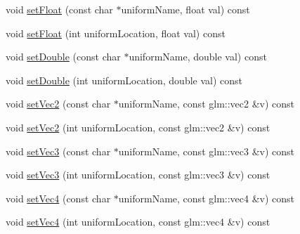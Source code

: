 \textbf{ }\par
\begin{DoxyCompactItemize}
\item 
void \mbox{\hyperlink{classec_1_1_shader_ad260a41b380803ac03632cd9d0157e6a}{set\+Float}} (const char $\ast$uniform\+Name, float val) const
\item 
void \mbox{\hyperlink{classec_1_1_shader_a71293d86a7e138561506f7315acdb5e7}{set\+Float}} (int uniform\+Location, float val) const
\end{DoxyCompactItemize}

\textbf{ }\par
\begin{DoxyCompactItemize}
\item 
void \mbox{\hyperlink{classec_1_1_shader_a096e33dd5ffe44b1f9ea80f4bf7c59ea}{set\+Double}} (const char $\ast$uniform\+Name, double val) const
\item 
void \mbox{\hyperlink{classec_1_1_shader_a8261c215f7716f0b607aee6876b08f6f}{set\+Double}} (int uniform\+Location, double val) const
\end{DoxyCompactItemize}

\textbf{ }\par
\begin{DoxyCompactItemize}
\item 
void \mbox{\hyperlink{classec_1_1_shader_abf4ccc409632dc1fd74d8334b835d8c5}{set\+Vec2}} (const char $\ast$uniform\+Name, const glm\+::vec2 \&v) const
\item 
void \mbox{\hyperlink{classec_1_1_shader_ae369480a833c4bdb910edf5beb8e4273}{set\+Vec2}} (int uniform\+Location, const glm\+::vec2 \&v) const
\end{DoxyCompactItemize}

\textbf{ }\par
\begin{DoxyCompactItemize}
\item 
void \mbox{\hyperlink{classec_1_1_shader_acf40e2badbdb021a269c4fec9b4bfb20}{set\+Vec3}} (const char $\ast$uniform\+Name, const glm\+::vec3 \&v) const
\item 
void \mbox{\hyperlink{classec_1_1_shader_ad56db104412fd877ffabcb04601a8e5b}{set\+Vec3}} (int uniform\+Location, const glm\+::vec3 \&v) const
\end{DoxyCompactItemize}

\textbf{ }\par
\begin{DoxyCompactItemize}
\item 
void \mbox{\hyperlink{classec_1_1_shader_aa311a1a3aba3a637886b8f019717adc9}{set\+Vec4}} (const char $\ast$uniform\+Name, const glm\+::vec4 \&v) const
\item 
void \mbox{\hyperlink{classec_1_1_shader_a2876cd885c089ff9f8e3dbb9639931f0}{set\+Vec4}} (int uniform\+Location, const glm\+::vec4 \&v) const
\end{DoxyCompactItemize}

